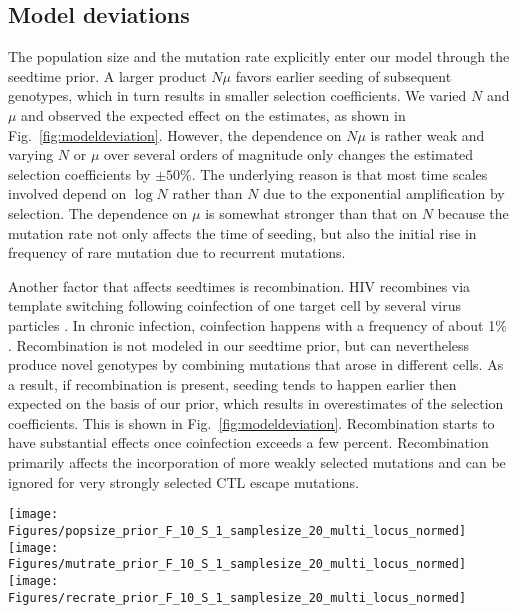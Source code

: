 \documentclass[rmp,twocolumn]{revtex4}
\newcommand{\FIG}[1]{Fig.~\ref{fig:#1}}
\begin{document}
\subsection*{Model deviations}
The population size and the mutation rate explicitly enter our model through the
seedtime prior. A larger product $N\mu$ favors earlier seeding of subsequent
genotypes, which in turn results in smaller selection coefficients. We varied
$N$ and $\mu$ and observed the expected effect on the estimates, as shown in
\FIG{modeldeviation}. However, the dependence on $N\mu$ is rather weak and
varying $N$ or $\mu$ over several orders of magnitude only changes the estimated
selection coefficients by $\pm 50\%$.
The underlying reason is that most time scales involved depend on $\log N$
rather than $N$ due to the exponential amplification by selection. The
dependence on $\mu$ is somewhat stronger than that on $N$ because the mutation
rate not only affects the time of seeding, but also the initial rise in
frequency of rare mutation due to recurrent mutations.

Another factor that affects seedtimes is recombination. HIV recombines 
via template switching following coinfection of one target cell by several virus
particles \citep{Levy:2004p23309}. In chronic infection, coinfection happens
with a frequency of about 1\% \citep{Neher:2010p32691,Batorsky:2011p40107}. Recombination is
not modeled in our seedtime prior, but can nevertheless produce novel genotypes by
combining mutations that arose in different cells. As a result, if recombination
is present, seeding tends to happen earlier then expected on the basis of our
prior, which results in overestimates of the selection coefficients. This is
shown in \FIG{modeldeviation}. Recombination starts to have substantial effects
once coinfection exceeds a few percent. Recombination primarily affects the
incorporation of more weakly selected mutations and can be ignored for very
strongly selected CTL escape mutations. 

\begin{figure*}[htp]
\begin{center}
  \texttt{[image: Figures/popsize\_prior\_F\_10\_S\_1\_samplesize\_20\_multi\_locus\_normed]}
  \texttt{[image: Figures/mutrate\_prior\_F\_10\_S\_1\_samplesize\_20\_multi\_locus\_normed]}
  \texttt{[image: Figures/recrate\_prior\_F\_10\_S\_1\_samplesize\_20\_multi\_locus\_normed]}
  \caption[labelInTOC]{The effect of assuming the wrong population parameters
  on the escape rate estimates. A) Assuming to large population sizes
  results in estimates that are too low. B) Similarly, if the mutation rate is
  assumed too large, the estimated seeding of multiple mutants occurs too late,
  and results in low estimates.
  C) If the actual population recombines, seeding occurs earlier
  than estimated, and estimates of selection coefficients go up. This effect is
  most pronounced for the weakly selected loci. }
  \label{fig:modeldeviation}
\end{center}
\end{figure*}
\end{document}
